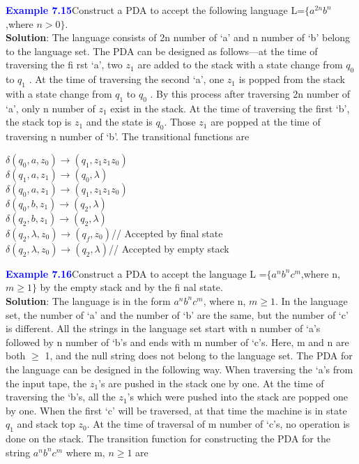 \documentclass{beamer}
\begin{document}
	
	\begin{frame}
	\textcolor{blue}{\textbf{Example 7.15}}\hspace{5mm}Construct a PDA to accept the following language L=$\lbrace$$a^{2n}b^{n}$,where $n>0$$\rbrace$.\\
	\textbf{Solution}: The language consists of 2n number of ‘a’ and n number of ‘b’ belong to the language set. The
	PDA can be designed as follows—at the time of traversing the fi rst ‘a’, two $z_1$ are added to the stack with
	a state change from $q_0$ to $q_1$ . At the time of traversing the second ‘a’, one $z_1$ is popped from the stack
	with a state change from $q_1$ to $q_0$ . By this process after traversing 2n number of ‘a’, only n number of $z_1$
	exist in the stack. At the time of traversing the first ‘b’, the stack top is $z_1$ and the state is $q_0$. Those $z_1$ are
	popped at the time of traversing n number of ‘b’.
	The transitional functions are
	\end{frame}
	\begin{frame}
		$\delta$$(q_0,a,z_0)\xrightarrow{}(q_1,z_1z_1z_0)$\\
		$\delta$$(q_1,a,z_1)\xrightarrow{}(q_0,\lambda)$\\
		$\delta$$(q_0,a,z_1)\xrightarrow{}(q_1,z_1z_1z_0)$\\
		$\delta$$(q_0,b,z_1)\xrightarrow{}(q_2,\lambda)$\\
		$\delta$$(q_2,b,z_1)\xrightarrow{}(q_2,\lambda)$\\
		$\delta$$(q_2,\lambda,z_0)\xrightarrow{}(q_f,z_0)$// Accepted by final state\\
		$\delta$$(q_2,\lambda,z_0)\xrightarrow{}(q_2,\lambda)$// Accepted by empty stack
	\end{frame}
\begin{frame}
	\textcolor{blue}{\textbf{Example 7.16}}\hspace{5mm}Construct a PDA to accept the language L =$\lbrace$$a^{n}b^{n}c^{m}$,where n, $m \geq 1$$\rbrace$ by the empty stack and by the fi nal state.\\
	\textbf{Solution}: The language is in the form $a^{n}b^{n}c^{m}$, where n, $m \geq 1$. In the language set, the number of ‘a’ and
	the number of ‘b’ are the same, but the number of ‘c’ is different. All the strings in the language set start
	with n number of ‘a’s followed by n number of ‘b’s and ends with m number of ‘c’s. Here, m and n are
	both $\geq$ 1, and the null string does not belong to the language set.
	The PDA for the language can be designed in the following way.
	When traversing the ‘a’s from the input tape, the $z_1$’s are pushed in the stack one by one. At the time
	of traversing the ‘b’s, all the $z_1$’s which were pushed into the stack are popped one by one. When the
	first ‘c’ will be traversed, at that time the machine is in state $q_1$ and stack top $z_0$. At the time of traversal
	of m number of ‘c’s, no operation is done on the stack.
	The transition function for constructing the PDA for the string $a^{n}b^{n}c^{m}$ where m, $n \geq 1$ are
\end{frame}
\end{document}
